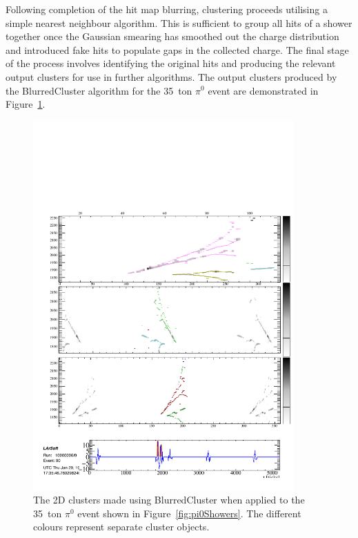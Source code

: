 Following completion of the hit map blurring, clustering proceeds utilising a simple nearest neighbour algorithm.  This is sufficient to group all hits of a shower together once the Gaussian smearing has smoothed out the charge distribution and introduced fake hits to populate gaps in the collected charge.  The final stage of the process involves identifying the original hits and producing the relevant output clusters for use in further algorithms.  The output clusters produced by the BlurredCluster algorithm for the 35~ton $\pi^0$ event are demonstrated in Figure~\ref{fig:pi0ShowersClusters}.

\begin{figure}
  \centering
  \includegraphics[width=10cm]{EVDPi0Clusters.pdf}
  \caption[The 2D clusters made using BlurredCluster when applied to the 35~ton $\pi^0$ event shown in Figure~\ref{fig:pi0Showers}.]{The 2D clusters made using BlurredCluster when applied to the 35~ton $\pi^0$ event shown in Figure~\ref{fig:pi0Showers}.  The different colours represent separate cluster objects.}
  \label{fig:pi0ShowersClusters}
\end{figure}

